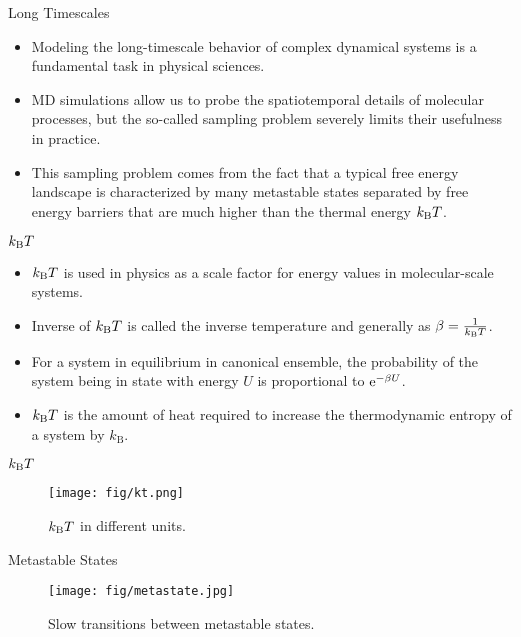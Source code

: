 \documentclass[10pt]{beamer}
\begin{document}
\begin{frame}{Long Timescales}
\begin{itemize}
\setlength\itemsep{1em}
  \item Modeling the long-timescale behavior of complex dynamical systems is a fundamental task in physical sciences.

  \item MD simulations allow us to probe the spatiotemporal details of molecular processes, but the so-called sampling problem severely limits their usefulness in practice.

  \item This sampling problem comes from the fact that a typical free energy landscape is characterized by many metastable states separated by free energy barriers that are much higher than the thermal energy $k_\mathrm{B}T$.
\end{itemize}
\end{frame}

\begin{frame}{$k_\mathrm{B}T$}
  \begin{itemize}
  \setlength\itemsep{1em}
    \item $k_\mathrm{B}T$ is used in physics as a scale factor for energy values in molecular-scale systems.
    \item Inverse of $k_\mathrm{B}T$ is called the inverse temperature and generally as $\beta=\frac{1}{k_\mathrm{B}T}$.
    \item For a system in equilibrium in canonical ensemble, the probability of the system being in state with energy $U$ is proportional to $\mathrm{e}^{-\beta U}$.
    \item $k_\mathrm{B}T$ is the amount of heat required to increase the thermodynamic entropy of a system by $k_{\mathrm{B}}$.
  \end{itemize}
\end{frame}

\begin{frame}{$k_\mathrm{B}T$}
  \begin{figure}
    \texttt{[image: fig/kt.png]}
    \caption{$k_\mathrm{B}T$ in different units.}
  \end{figure}
\end{frame}

\begin{frame}{Metastable States}
  \begin{figure}
    \texttt{[image: fig/metastate.jpg]}
    \caption{Slow transitions between metastable states.}
  \end{figure}
\end{frame}
\end{document}
